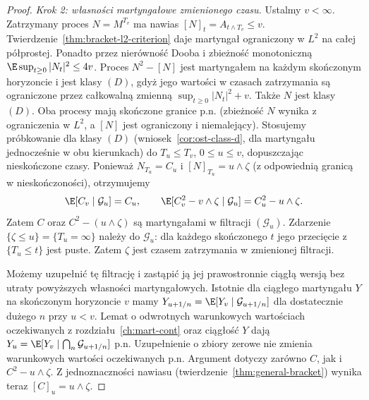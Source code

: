 \begin{proof}
\emph{Krok 2: własności martyngałowe zmienionego czasu.}
Ustalmy $v<\infty$. Zatrzymany proces $N=M^{T_v}$
ma nawias $[N]_t=A_{t\wedge T_v}\le v$.
Twierdzenie~\ref{thm:bracket-l2-criterion}
daje martyngał ograniczony w $L^2$ na całej
półprostej. Ponadto przez nierówność Dooba
i zbieżność monotoniczną
$\E\sup_{t\ge0}|N_t|^2\le4v$.
Proces $N^2-[N]$ jest martyngałem na każdym
skończonym horyzoncie i jest klasy $(D)$,
gdyż jego wartości w czasach zatrzymania
są ograniczone przez całkowalną zmienną
$\sup_{t\ge0}|N_t|^2+v$.
Także $N$ jest klasy $(D)$.
Oba procesy mają skończone granice p.n.
(zbieżność $N$ wynika z ograniczenia w $L^2$,
a $[N]$ jest ograniczony i niemalejący).
Stosujemy próbkowanie dla klasy $(D)$
(wniosek~\ref{cor:ost-class-d}, dla martyngału
jednocześnie w obu kierunkach) do $T_u\le T_v$,
$0\le u\le v$, dopuszczając nieskończone czasy.
Ponieważ $N_{T_u}=C_u$ i $[N]_{T_u}=u\wedge\zeta$
(z odpowiednią granicą w nieskończoności),
otrzymujemy
\[
\E[C_v\mid\mathcal G_u]=C_u,\qquad
\E[C_v^2-v\wedge\zeta\mid\mathcal G_u]
=C_u^2-u\wedge\zeta.
\]
Zatem $C$ oraz $C^2-(u\wedge\zeta)$
są martyngałami w filtracji $(\mathcal G_u)$.
Zdarzenie $\{\zeta\le u\}=\{T_u=\infty\}$
należy do $\mathcal G_u$:
dla każdego skończonego $t$ jego przecięcie
z $\{T_u\le t\}$ jest puste.
Zatem $\zeta$ jest czasem zatrzymania
w zmienionej filtracji.

Możemy uzupełnić tę filtrację i zastąpić ją
jej prawostronnie ciągłą wersją bez utraty
powyższych własności martyngałowych.
Istotnie dla ciągłego martyngału $Y$
na skończonym horyzoncie $v$ mamy
$Y_{u+1/n}=\E[Y_v\mid\mathcal G_{u+1/n}]$
dla dostatecznie dużego $n$ przy $u<v$.
Lemat o odwrotnych warunkowych wartościach
oczekiwanych z rozdziału~\ref{ch:mart-cont}
oraz ciągłość $Y$ dają
$Y_u=\E[Y_v\mid\bigcap_n\mathcal G_{u+1/n}]$ p.n.
Uzupełnienie o zbiory zerowe nie zmienia
warunkowych wartości oczekiwanych p.n.
Argument dotyczy zarówno $C$, jak i $C^2-u\wedge\zeta$.
Z jednoznaczności nawiasu
(twierdzenie~\ref{thm:general-bracket})
wynika teraz $[C]_u=u\wedge\zeta$.


\end{proof}
